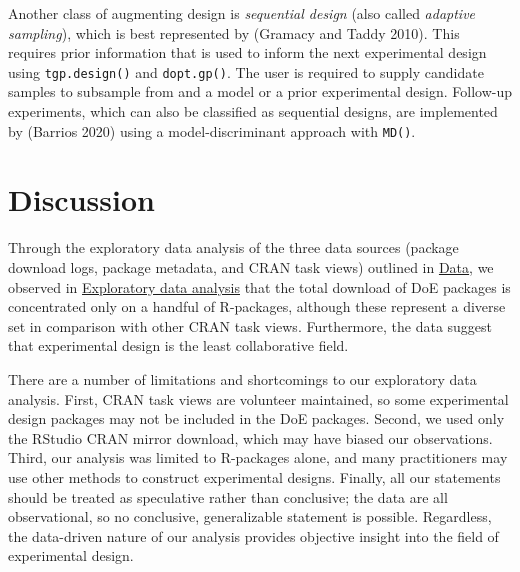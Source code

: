Another class of augmenting design is \emph{sequential design} (also called \emph{adaptive sampling}), which is best represented by  (Gramacy and Taddy 2010). This requires prior information that is used to inform the next experimental design using \texttt{tgp.design()} and \texttt{dopt.gp()}. The user is required to supply candidate samples to subsample from and a model or a prior experimental design. Follow-up experiments, which can also be classified as sequential designs, are implemented by  (Barrios 2020) using a model-discriminant approach with \texttt{MD()}.

\hypertarget{discussion}{%
\section{Discussion}\label{discussion}}

Through the exploratory data analysis of the three data sources (package download logs, package metadata, and CRAN task views) outlined in \hyperref[data]{Data}, we observed in \hyperref[eda]{Exploratory data analysis} that the total download of DoE packages is concentrated only on a handful of R-packages, although these represent a diverse set in comparison with other CRAN task views. Furthermore, the data suggest that experimental design is the least collaborative field.

There are a number of limitations and shortcomings to our exploratory data analysis. First, CRAN task views are volunteer maintained, so some experimental design packages may not be included in the DoE packages. Second, we used only the RStudio CRAN mirror download, which may have biased our observations. Third, our analysis was limited to R-packages alone, and many practitioners may use other methods to construct experimental designs. Finally, all our statements should be treated as speculative rather than conclusive; the data are all observational, so no conclusive, generalizable statement is possible. Regardless, the data-driven nature of our analysis provides objective insight into the field of experimental design.

